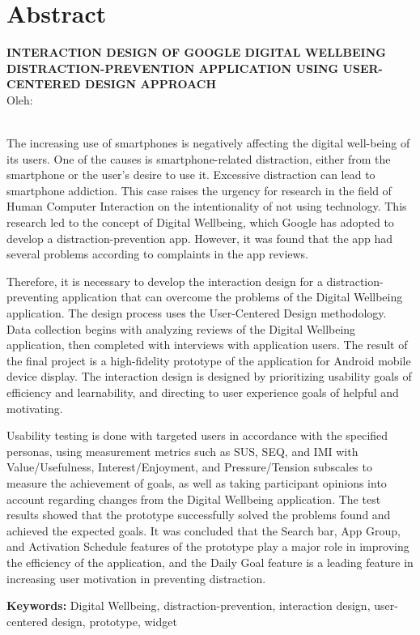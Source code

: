 \clearpage
\chapter*{Abstract}

\begin{center}
  \textbf{\MakeUppercase{Interaction Design of Google Digital Wellbeing Distraction-Prevention Application using User-Centered Design Approach}} \\[1em]
  
  Oleh: \\
  \MakeUppercase{\theauthor} \\

\end{center}

\begin{singlespace}
  The increasing use of smartphones is negatively affecting the digital well-being of its users. One of the causes is smartphone-related distraction, either from the smartphone or the user's desire to use it. Excessive distraction can lead to smartphone addiction. This case raises the urgency for research in the field of Human Computer Interaction on the intentionality of not using technology. This research led to the concept of Digital Wellbeing, which Google has adopted to develop a distraction-prevention app. However, it was found that the app had several problems according to complaints in the app reviews.

  Therefore, it is necessary to develop the interaction design for a distraction-preventing application that can overcome the problems of the Digital Wellbeing application. The design process uses the User-Centered Design methodology. Data collection begins with analyzing reviews of the Digital Wellbeing application, then completed with interviews with application users. The result of the final project is a high-fidelity prototype of the application for Android mobile device display. The interaction design is designed by prioritizing usability goals of efficiency and learnability, and directing to user experience goals of helpful and motivating.

  Usability testing is done with targeted users in accordance with the specified personas, using measurement metrics such as SUS, SEQ, and IMI with Value/Usefulness, Interest/Enjoyment, and Pressure/Tension subscales to measure the achievement of goals, as well as taking participant opinions into account regarding changes from the Digital Wellbeing application. The test results showed that the prototype successfully solved the problems found and achieved the expected goals. It was concluded that the Search bar, App Group, and Activation Schedule features of the prototype play a major role in improving the efficiency of the application, and the Daily Goal feature is a leading feature in increasing user motivation in preventing distraction.

  \noindent \textbf{Keywords:} Digital Wellbeing, distraction-prevention, interaction design, user-centered design, prototype, widget

\end{singlespace}
